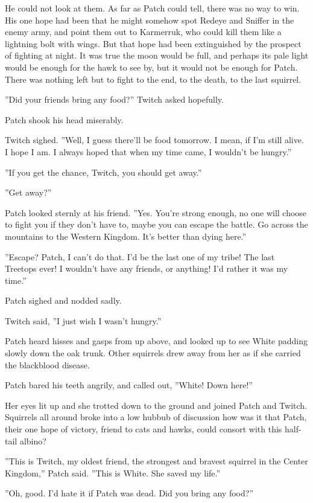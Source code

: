 \documentclass[12pt]{book}
\begin{document}
He could not look at them. As far as Patch could tell, there was no way to win. His one hope had been that he might somehow spot Redeye and Sniffer in the enemy army, and point them out to Karmerruk, who could kill them like a lightning bolt with wings. But that hope had been extinguished by the prospect of fighting at night. It was true the moon would be full, and perhaps its pale light would be enough for the hawk to see by, but it would not be enough for Patch. There was nothing left but to fight to the end, to the death, to the last squirrel. 

''Did your friends bring any food?'' Twitch asked hopefully.

Patch shook his head miserably.

Twitch sighed. ''Well, I guess there'll be food tomorrow. I mean, if I'm still alive. I hope I am. I always hoped that when my time came, I wouldn't be hungry.''

''If you get the chance, Twitch, you should get away.''

''Get away?''

Patch looked sternly at his friend. ''Yes. You're strong enough, no one will choose to fight you if they don't have to, maybe you can escape the battle. Go across the mountains to the Western Kingdom. It's better than dying here.''

''Escape? Patch, I can't do that. I'd be the last one of my tribe! The last Treetops ever! I wouldn't have any friends, or anything! I'd rather it was my time.''

Patch sighed and nodded sadly.

Twitch said, ''I just wish I wasn't hungry.''

Patch heard hisses and gasps from up above, and looked up to see White padding slowly down the oak trunk. Other squirrels drew away from her as if she carried the blackblood disease.

Patch bared his teeth angrily, and called out, ''White! Down here!''

Her eyes lit up and she trotted down to the ground and joined Patch and Twitch. Squirrels all around broke into a low hubbub of discussion %
how was it that Patch, their one hope of victory, friend to cats and hawks, could consort with this half-tail albino?

''This is Twitch, my oldest friend, the strongest and bravest squirrel in the Center Kingdom,'' Patch said. ''This is White. She saved my life.''

''Oh, good. I'd hate it if Patch was dead. Did you bring any food?''
\end{document}
